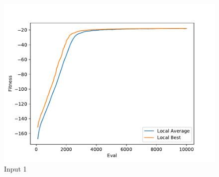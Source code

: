 \documentclass{standalone}
\begin{document}
\begin{figure}[!htb]
	\caption{Input 1}
	\label{fig:graph_1070}
	\includegraphics[width=\textwidth]{../graphs/graphs/1070.pdf}
\end{figure}
\end{document}
